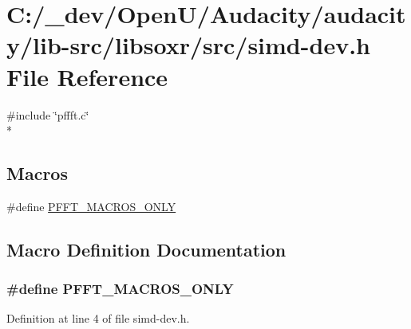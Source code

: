 \hypertarget{simd-dev_8h}{}\section{C\+:/\+\_\+dev/\+Open\+U/\+Audacity/audacity/lib-\/src/libsoxr/src/simd-\/dev.h File Reference}
\label{simd-dev_8h}
{\ttfamily \#include \char`\"{}pffft.\+c\char`\"{}}\\*
\subsection*{Macros}
\begin{DoxyCompactItemize}
\item 
\#define \hyperlink{simd-dev_8h_abe8c062769455dc66b227ffb5f98bb40}{P\+F\+F\+T\+\_\+\+M\+A\+C\+R\+O\+S\+\_\+\+O\+N\+LY}
\end{DoxyCompactItemize}


\subsection{Macro Definition Documentation}
\subsubsection[{\texorpdfstring{P\+F\+F\+T\+\_\+\+M\+A\+C\+R\+O\+S\+\_\+\+O\+N\+LY}{PFFT_MACROS_ONLY}}]{\setlength{\rightskip}{0pt plus 5cm}\#define P\+F\+F\+T\+\_\+\+M\+A\+C\+R\+O\+S\+\_\+\+O\+N\+LY}\hypertarget{simd-dev_8h_abe8c062769455dc66b227ffb5f98bb40}{}\label{simd-dev_8h_abe8c062769455dc66b227ffb5f98bb40}


Definition at line 4 of file simd-\/dev.\+h.

